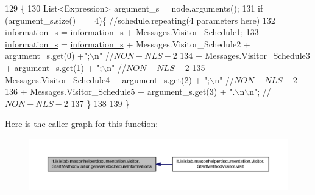 \begin{DoxyCode}
129                                                                      \{
130         List<Expression> argument\_s = node.arguments();
131         \textcolor{keywordflow}{if} (argument\_s.size() == 4)\{    \textcolor{comment}{//schedule.repeating(4 parameters here)}
132             \hyperlink{classit_1_1isislab_1_1masonhelperdocumentation_1_1visitor_1_1_start_method_visitor_a59b86134adb11f995ce96c1a96b51d50}{information\_s} = \hyperlink{classit_1_1isislab_1_1masonhelperdocumentation_1_1visitor_1_1_start_method_visitor_a59b86134adb11f995ce96c1a96b51d50}{information\_s} + 
      \hyperlink{classit_1_1isislab_1_1masonhelperdocumentation_1_1visitor_1_1_messages_a50822a1d6f5dd658aac1c947608b524b}{Messages.Visitor\_Schedule1};
133             \hyperlink{classit_1_1isislab_1_1masonhelperdocumentation_1_1visitor_1_1_start_method_visitor_a59b86134adb11f995ce96c1a96b51d50}{information\_s} = \hyperlink{classit_1_1isislab_1_1masonhelperdocumentation_1_1visitor_1_1_start_method_visitor_a59b86134adb11f995ce96c1a96b51d50}{information\_s} + Messages.Visitor\_Schedule2 + 
      argument\_s.get(0) +\textcolor{stringliteral}{";\(\backslash\)n"} \textcolor{comment}{//$NON-NLS-2$}
134                                 + Messages.Visitor\_Schedule3 + argument\_s.get(1) + \textcolor{stringliteral}{";\(\backslash\)n"} \textcolor{comment}{//$NON-NLS-2$}
135                                 + Messages.Visitor\_Schedule4 + argument\_s.get(2) + \textcolor{stringliteral}{";\(\backslash\)n"} \textcolor{comment}{//$NON-NLS-2$}
136                                 + Messages.Visitor\_Schedule5 + argument\_s.get(3) + \textcolor{stringliteral}{".\(\backslash\)n\(\backslash\)n"}; \textcolor{comment}{//$NON-NLS-2$}
137         \}
138         
139     \}
\end{DoxyCode}


Here is the caller graph for this function\-:\nopagebreak
\begin{figure}[H]
\begin{center}
\leavevmode
\includegraphics[width=350pt]{classit_1_1isislab_1_1masonhelperdocumentation_1_1visitor_1_1_start_method_visitor_a0961ec6f09ea3a15c8d97240d4703eb2_icgraph}
\end{center}
\end{figure}



